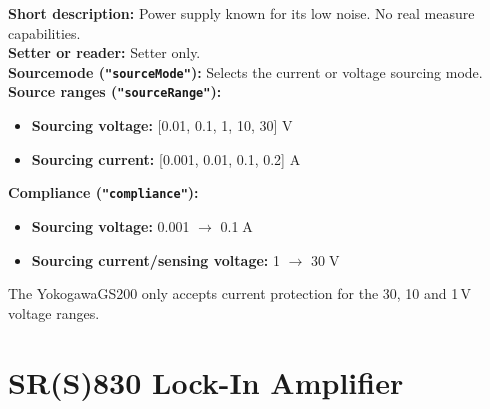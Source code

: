 \textbf{\textsf{Short description}:} Power supply known for its low noise. No real measure capabilities. \\
\textbf{\textsf{Setter or reader}:} Setter only.\\
\textbf{\textsf{Sourcemode} (\texttt{"sourceMode"}):} Selects the current or voltage sourcing mode.\\
\textbf{\textsf{Source ranges} (\texttt{"sourceRange"}):}
\begin{itemize}[noitemsep]
\item \textbf{\textsf{Sourcing voltage:}} [0.01, 0.1, 1, 10, 30] V\\
\item \textbf{\textsf{Sourcing current:}} [0.001, 0.01, 0.1, 0.2] A
\end{itemize}
\textbf{\textsf{Compliance} (\texttt{"compliance"}):}
\begin{itemize}[noitemsep]
\item \textbf{\textsf{Sourcing voltage:}} 0.001 $\rightarrow$ 0.1$\;$A\\
\item \textbf{\textsf{Sourcing current/sensing voltage:}} 1 $\rightarrow$ 30$\;$V
\end{itemize}
The YokogawaGS200 only accepts current protection for the 30, 10 and 1$\,$V voltage ranges.\\

\section{SR(S)830 Lock-In Amplifier}

